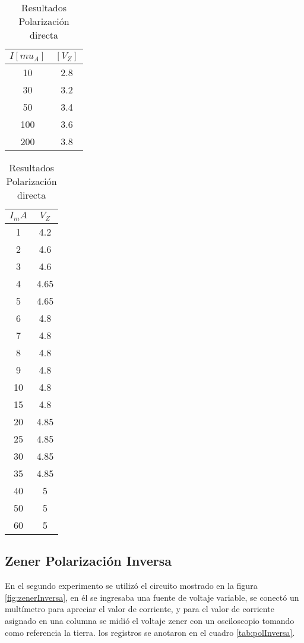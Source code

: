 \documentclass{article}
\begin{document}
\begin{table}[h!]
\centering

\begin{tabular}{|c|c|}
\hline
$I [mu_A]$ & $[V_Z]$ \\ \hline
10          & 2.8  \\ \hline
30          & 3.2  \\ \hline
50          & 3.4  \\ \hline
100         & 3.6  \\ \hline
200         & 3.8  \\ \hline
\end{tabular}
\quad
\begin{tabular}{|c|c|}
\hline
$I_mA$ & $V_Z$ \\ \hline
1          & 4.2  \\ \hline
2          & 4.6  \\ \hline
3          & 4.6  \\ \hline
4          & 4.65 \\ \hline
5          & 4.65 \\ \hline
6          & 4.8  \\ \hline
7          & 4.8  \\ \hline
8          & 4.8  \\ \hline
9          & 4.8  \\ \hline
10         & 4.8  \\ \hline
15         & 4.8  \\ \hline
20         & 4.85 \\ \hline
25         & 4.85 \\ \hline
30         & 4.85 \\ \hline
35         & 4.85 \\ \hline
40         & 5    \\ \hline
50         & 5    \\ \hline
60         & 5    \\ \hline
\end{tabular}

\caption{Resultados Polarización directa}
\label{tab:polDirecta}
\end{table}






\subsection{Zener Polarización Inversa}

En el segundo experimento se utilizó el circuito mostrado en la figura \ref{fig:zenerInversa}, en él se ingresaba una fuente de voltaje variable, se conectó un multímetro para apreciar el valor de corriente, y para el valor de corriente asignado en una columna se midió el voltaje zener con un osciloscopio tomando como referencia la tierra. los registros se anotaron en el cuadro \ref{tab:polInversa}.\\ 
\end{document}
